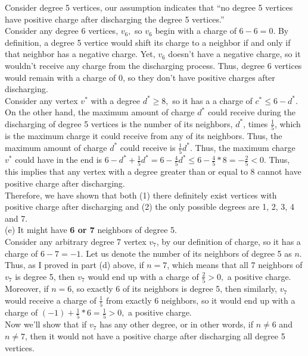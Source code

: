 \documentclass{article}
\begin{document}
\indent Consider degree 5 vertices, our assumption indicates that ``no degree 5 vertices have positive charge after discharging the degree 5 vertices.'' \\[.1cm]
\indent Consider any degree 6 vertices, $v_6,$ so $v_6$ begin with a charge of $6 - 6 = 0.$ By definition, a degree 5 vertice would shift its charge to a neighbor if and only if that neighbor has a negative charge. Yet, $v_6$ doesn't have a negative charge, so it wouldn't receive any charge from the discharging process. Thus, degree 6 vertices would remain with a charge of 0, so they don't have positive charges after discharging.\\[.1cm]
\indent Consider any vertex $v^*$ with a degree $d^*\geq8,$ so it has a a charge of $c^*\leq 6 - d^*.$ On the other hand, the maximum amount of charge $d^*$ could receive during the discharging of degree 5 vertices is the number of its neighbors, $d^*$, times $\frac{1}{5}$, which is the maximum charge it could receive from any of its neighbors. Thus, the maximum amount of charge $d^*$ could receive is $\frac{1}{5} d^*.$ Thus, the maximum charge $v^*$ could have in the end is $6 - d^* + \frac{1}{5}d^* = 6 - \frac{4}{5}d^* \leq 6 - \frac{4}{5}*8 = -\frac{2}{5} < 0.$ Thus, this implies that any vertex with a degree greater than or equal to 8 cannot have positive charge after discharging.\\[.1cm]
\indent Therefore, we have shown that both (1) there definitely exist vertices with positive charge after discharging and (2) the only possible degrees are 1, 2, 3, 4 and 7. \\[.5cm]
(e) It might have \textbf{6 or 7} neighbors of degree 5.\\[.3cm]
\indent Consider any arbitrary degree 7 vertex $v_7$, by our definition of charge, so it has a charge of $6 - 7 = -1.$ Let us denote the number of its neighbors of degree 5 as $n.$ Thus, as I proved in part (d) above, if $n = 7$, which means that all 7 neighbors of $v_7$ is degree 5, then $v_7$ would end up with a charge of $\frac{2}{5} > 0,$ a positive charge. Moreover, if $n = 6$, so exactly 6 of its neighbors is degree 5, then similarly, $v_7$ would receive a charge of $\frac{1}{5}$ from exactly 6 neighbors, so it would end up with a charge of $(-1) + \frac{1}{5} * 6 = \frac{1}{5} > 0,$ a positive charge. \\[.1cm]
\indent Now we'll show that if $v_7$ has any other degree, or in other words, if $n\neq6$ and $n\neq7$, then it would not have a positive charge after discharging all degree 5 vertices. \\[.1cm]
\end{document}
